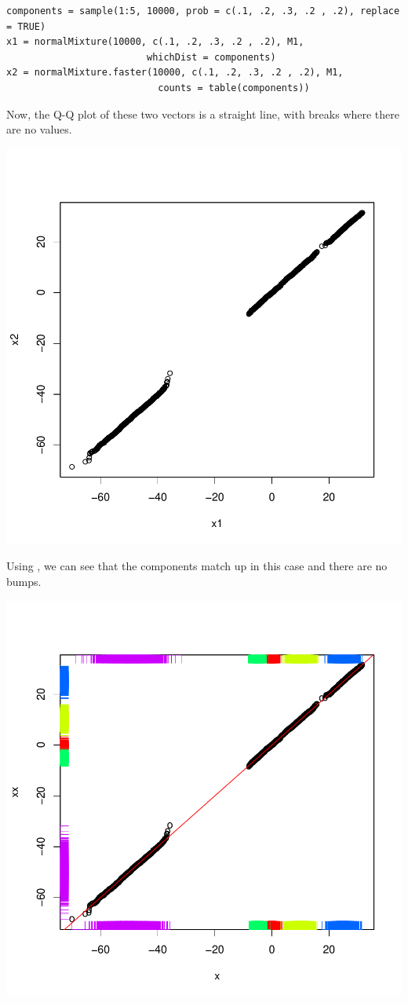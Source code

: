 \documentclass{article}
\begin{document}
\begin{description}
\begin{verbatim}
components = sample(1:5, 10000, prob = c(.1, .2, .3, .2 , .2), replace = TRUE)
x1 = normalMixture(10000, c(.1, .2, .3, .2 , .2), M1,
                         whichDist = components)
x2 = normalMixture.faster(10000, c(.1, .2, .3, .2 , .2), M1,
                           counts = table(components))
\end{verbatim}
Now, the Q-Q plot of these two vectors is a straight line,
with  breaks where there are no values.

\includegraphics{images/SimpleQQEqualCount.pdf}

Using , we can see that the components match up
in this case and there are no bumps.

\includegraphics{images/QQEqualCount.pdf}


\end{description}
\end{document}
